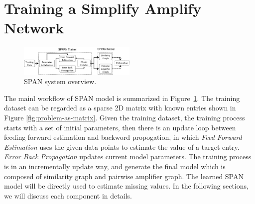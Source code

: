 \documentclass[conference,compsoc]{IEEEtran}
\begin{document}

\section{Training a Simplify Amplify Network}
\label{sec:trainer}

\begin{figure}[!ht]
  \centering  \includegraphics[width=0.5\textwidth]{figures/model.pdf}
  \caption{SPAN system overview.}
  \label{fig:model}
\end{figure}

The mainl workflow of SPAN model is summarized in Figure~\ref{fig:model}. 
The training dataset can be regarded as a sparse 2D matrix with known entries shown in Figure \ref{fig:problem-as-matrix}.  Given the training dataset, the training process starts with a set of initial parameters,  then there is an update loop between feeding forward estimation and backword propogation, in which {\it Feed Forward Estimation} uses the given data points to estimate the value of a target entry.  {\it Error Back Propagation}  updates current model parameters.  The training process is in an incrementally update way, and generate the final model which is composed of similarity graph and pairwise amplifier graph. The learned SPAN model will be directly used to estimate missing values.  In the following sections, we will discuss each component in details. 
\end{document}
